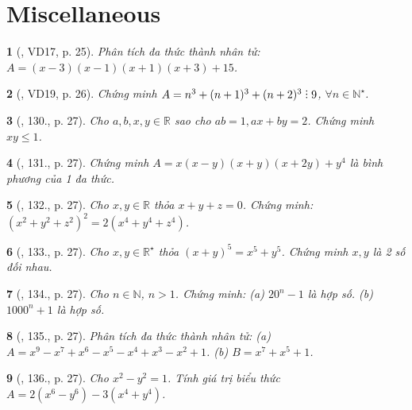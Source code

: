 \documentclass{article}
\newtheorem{baitoan}{}
\DeclareRobustCommand{\divby}{%
	\mathrel{\vbox{\baselineskip.65ex\lineskiplimit0pt\hbox{.}\hbox{.}\hbox{.}}}%
}
\begin{document}
\section{Miscellaneous}

\begin{baitoan}[\cite{Tuyen_Toan_8}, VD17, p. 25]
	Phân tích đa thức thành nhân tử: $A = (x - 3)(x - 1)(x + 1)(x + 3) + 15$.
\end{baitoan}

\begin{baitoan}[\cite{Tuyen_Toan_8}, VD19, p. 26]
	Chứng minh $A = n^3 + (n + 1)^3 + (n + 2)^3\divby9$, $\forall n\in\mathbb{N}^\star$.
\end{baitoan}

\begin{baitoan}[\cite{Tuyen_Toan_8}, 130., p. 27]
	Cho $a,b,x,y\in\mathbb{R}$ sao cho $ab = 1,ax + by = 2$. Chứng minh $xy\le1$.
\end{baitoan}

\begin{baitoan}[\cite{Tuyen_Toan_8}, 131., p. 27]
	Chứng minh $A = x(x - y)(x + y)(x + 2y) + y^4$ là bình phương của 1 đa thức.
\end{baitoan}

\begin{baitoan}[\cite{Tuyen_Toan_8}, 132., p. 27]
	Cho $x,y\in\mathbb{R}$ thỏa $x + y + z = 0$. Chứng minh: $(x^2 + y^2 + z^2)^2 = 2(x^4 + y^4 + z^4)$.
\end{baitoan}

\begin{baitoan}[\cite{Tuyen_Toan_8}, 133., p. 27]
	Cho $x,y\in\mathbb{R}^\star$ thỏa $(x + y)^5 = x^5 + y^5$. Chứng minh $x,y$ là 2 số đối nhau.
\end{baitoan}

\begin{baitoan}[\cite{Tuyen_Toan_8}, 134., p. 27]
	Cho $n\in\mathbb{N}$, $n > 1$. Chứng minh: (a) $20^n - 1$ là hợp số. (b) $1000^n + 1$ là hợp số.
\end{baitoan}

\begin{baitoan}[\cite{Tuyen_Toan_8}, 135., p. 27]
	Phân tích đa thức thành nhân tử: (a) $A = x^9 - x^7 + x^6 - x^5 - x^4 + x^3 - x^2 + 1$. (b) $B = x^7 + x^5 + 1$.
\end{baitoan}

\begin{baitoan}[\cite{Tuyen_Toan_8}, 136., p. 27]
	Cho $x^2 - y^2 = 1$. Tính giá trị biểu thức $A = 2(x^6 - y^6) - 3(x^4 + y^4)$.
\end{baitoan}
\end{document}
